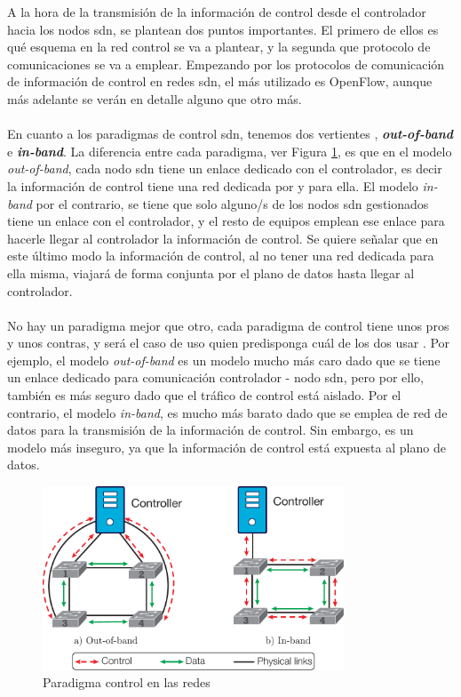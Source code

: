 A la hora de la transmisión de la información de control desde el controlador hacia los nodos \gls{sdn}, se plantean dos puntos importantes. El primero de ellos es qué esquema en la red control se va a plantear, y la segunda que protocolo de comunicaciones se va a emplear. Empezando por los protocolos de comunicación de información de control en redes \gls{sdn}, el más utilizado es OpenFlow, aunque más adelante se verán en detalle alguno que otro más.\\
\\
En cuanto a los paradigmas de control \gls{sdn}, tenemos dos vertientes \cite{carrascal2023comprehensive}, \textbf{\textit{out-of-band}} e \textbf{\textit{in-band}}. La diferencia entre cada paradigma, ver Figura \ref{fig:sdnParadigControl}, es que en el modelo \textit{out-of-band}, cada nodo \gls{sdn} tiene un enlace dedicado con el controlador, es decir la información de control tiene una red dedicada por y para ella. El modelo \textit{in-band} por el contrario, se tiene que solo alguno/s de los nodos \gls{sdn} gestionados tiene un enlace con el controlador, y el resto de equipos emplean ese enlace para hacerle llegar al controlador la información de control. Se quiere señalar que en este último modo la información de control, al no tener una red dedicada para ella misma, viajará de forma conjunta por el plano de datos hasta llegar al controlador. \\
\\
No hay un paradigma mejor que otro, cada paradigma de control tiene unos pros y unos contras, y será el caso de uso quien predisponga cuál de los dos usar \cite{jalili2017comprehensive}. Por ejemplo, el modelo \textit{out-of-band} es un modelo mucho más caro dado que se tiene un enlace dedicado para comunicación controlador - nodo \gls{sdn}, pero por ello, también es más seguro dado que el tráfico de control está aislado. Por el contrario, el modelo \textit{in-band}, es mucho más barato dado que se emplea de red de datos para la transmisión de la información de control. Sin embargo, es un modelo más inseguro, ya que la información de control está expuesta al plano de datos.
\begin{figure}[ht]
    \centering
    \includegraphics[width=0.8\textwidth]{archivos/img/intro/InBandOutBandScheme.pdf}
    \caption{Paradigma control en las redes  \cite{carrascal2023comprehensive}}
    \label{fig:sdnParadigControl}
\end{figure}

